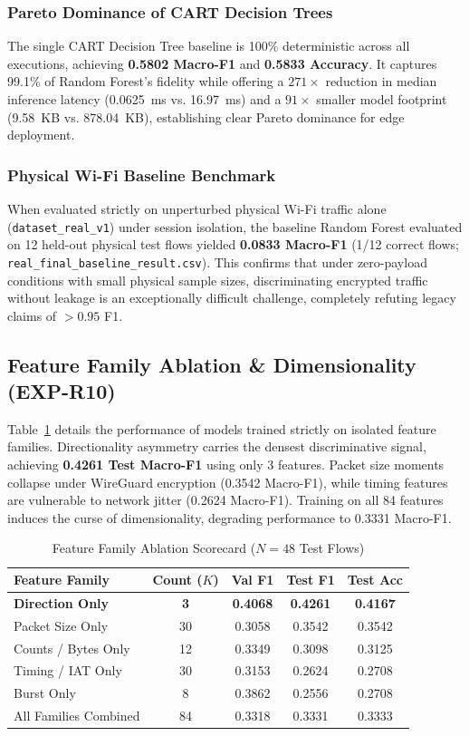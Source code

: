 \documentclass[conference]{IEEEtran}
\begin{document}
\subsubsection{Pareto Dominance of CART Decision Trees}
The single CART Decision Tree baseline is 100\% deterministic across all executions, achieving \textbf{0.5802 Macro-F1} and \textbf{0.5833 Accuracy}. It captures 99.1\% of Random Forest's fidelity while offering a $271\times$ reduction in median inference latency (0.0625~ms vs. 16.97~ms) and a $91\times$ smaller model footprint (9.58~KB vs. 878.04~KB), establishing clear Pareto dominance for edge deployment.

\subsubsection{Physical Wi-Fi Baseline Benchmark}
When evaluated strictly on unperturbed physical Wi-Fi traffic alone (\texttt{dataset\_real\_v1}) under session isolation, the baseline Random Forest evaluated on 12 held-out physical test flows yielded \textbf{0.0833 Macro-F1} (1/12 correct flows; \texttt{real\_final\_baseline\_result.csv}). This confirms that under zero-payload conditions with small physical sample sizes, discriminating encrypted traffic without leakage is an exceptionally difficult challenge, completely refuting legacy claims of $>0.95$ F1.

\subsection{Feature Family Ablation \& Dimensionality (EXP-R10)}
Table~\ref{tab:feature_family_ablation} details the performance of models trained strictly on isolated feature families. Directionality asymmetry carries the densest discriminative signal, achieving \textbf{0.4261 Test Macro-F1} using only 3 features. Packet size moments collapse under WireGuard encryption (0.3542 Macro-F1), while timing features are vulnerable to network jitter (0.2624 Macro-F1). Training on all 84 features induces the curse of dimensionality, degrading performance to 0.3331 Macro-F1.

\begin{table}[t]
\centering
\caption{Feature Family Ablation Scorecard ($N=48$ Test Flows)}
\label{tab:feature_family_ablation}
\footnotesize
\begin{tabularx}{\columnwidth}{lcccc}
\toprule
\textbf{Feature Family} & \textbf{Count ($K$)} & \textbf{Val F1} & \textbf{Test F1} & \textbf{Test Acc} \\
\midrule
\textbf{Direction Only} & \textbf{3} & \textbf{0.4068} & \textbf{0.4261} & \textbf{0.4167} \\
Packet Size Only & 30 & 0.3058 & 0.3542 & 0.3542 \\
Counts / Bytes Only & 12 & 0.3349 & 0.3098 & 0.3125 \\
Timing / IAT Only & 30 & 0.3153 & 0.2624 & 0.2708 \\
Burst Only & 8 & 0.3862 & 0.2556 & 0.2708 \\
All Families Combined & 84 & 0.3318 & 0.3331 & 0.3333 \\
\bottomrule
\end{tabularx}
\end{table}
\end{document}
